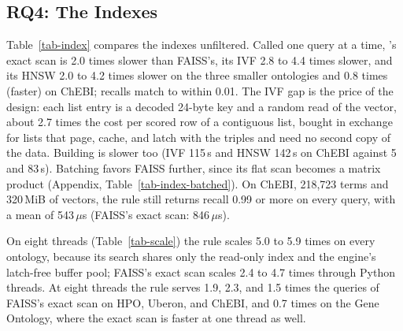 \subsection{RQ4: The Indexes}



\noindent
Table~\ref{tab-index} compares the indexes unfiltered.
Called one query at a time, \sys's exact scan is 2.0 times slower than FAISS's, its IVF
2.8 to 4.4 times slower, and its HNSW 2.0 to 4.2 times slower on the three smaller
ontologies and 0.8 times (faster) on ChEBI; recalls match to within 0.01.
The IVF gap is the price of the design: each list entry is a decoded 24-byte key and a
random read of the vector, about 2.7 times the cost per scored row of a contiguous list,
bought in exchange for lists that page, cache, and latch with the triples and need no
second copy of the data.
Building is slower too (IVF 115\,s and HNSW 142\,s on ChEBI against 5 and 83\,s).
Batching favors FAISS further, since its flat scan becomes a matrix product (Appendix,
Table~\ref{tab-index-batched}).
On ChEBI, 218,723 terms and 320\,MiB of vectors, the rule still returns recall 0.99 or
more on every query, with a mean of 543\,$\mu$s (FAISS's exact scan: 846\,$\mu$s).



\noindent
On eight threads (Table~\ref{tab-scale}) the rule scales 5.0 to 5.9 times on every ontology,
because its search shares only the read-only index and the engine's latch-free buffer pool;
FAISS's exact scan scales 2.4 to 4.7 times through Python threads.
At eight threads the rule serves 1.9, 2.3, and 1.5 times the queries of FAISS's exact
scan on HPO, Uberon, and ChEBI, and 0.7 times on the Gene Ontology, where the exact
scan is faster at one thread as well.
